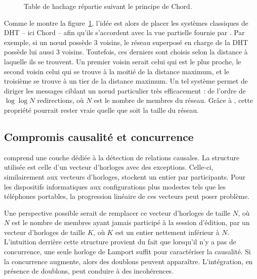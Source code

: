 \begin{figure}
  \begin{center}
    
    \caption[Table de hachage répartie]
    {\label{conclu:fig:dhtexample}Table de hachage répartie suivant le principe
      de Chord.}
  \end{center}
\end{figure}

Comme le montre la figure~\ref{conclu:fig:dhtexample}, l'idée est alors de
placer les systèmes classiques de DHT -- ici Chord -- afin qu'ils s'accordent
avec la vue partielle fournie par \SPRAY. Par exemple, si un nœud \SPRAY possède
3 voisins, le réseau superposé en charge de la DHT possède lui aussi 3
voisins. Toutefois, ces derniers sont choisis selon la distance à laquelle ils
se trouvent. Un premier voisin serait celui qui est le plus proche, le second
voisin celui qui se trouve à la moitié de la distance maximum, et le troisième
se trouve à un tier de la distance maximum. Un tel système permet de diriger les
messages ciblant un nœud particulier très efficacement : de l'ordre de
$\log\log N$ redirections, où $N$ est le nombre de membres du réseau. Grâce à
\SPRAY, cette propriété pourrait rester vraie quelle que soit la taille du
réseau.



\subsection{Compromis causalité et concurrence}

\CRATE comprend une couche dédiée à la détection de relations causales. La
structure utilisée est celle d'un vecteur d'horloges avec des
exceptions. Celle-ci, similairement aux vecteurs d'horloges, stockent un entier
par participants. Pour les dispositifs informatiques aux configurations plus
modestes tels que les téléphones portables, la progression linéaire de ces
vecteurs peut poser problème. 

Une perspective possible serait de remplacer ce vecteur d'horloges de taille
$N$, où $N$ est le nombre de membres ayant jamais participé à la session
d'édition, par un vecteur d'horloges de taille $K$, où $K$ est un entier
nettement inférieur à $N$. L'intuition derrière cette structure provient du
fait que lorsqu'il n'y a pas de concurrence, une seule horloge de Lamport suffit
pour caractériser la causalité. Si la concurrence augmente, alors des doublons
peuvent apparaître. L'intégration, en présence de doublons, peut conduire à des
incohérences.

